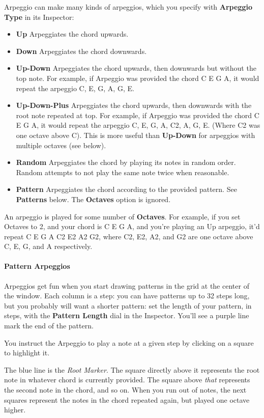 \documentclass[twoside,10pt]{article}
\begin{document}
Arpeggio can make many kinds of arpeggios, which you specify with {\bf Arpeggio Type} in its Inspector:

\begin{itemize}
\item {\bf Up} Arpeggiates the chord upwards. 
\item {\bf Down} Arpeggiates the chord downwards. 
\item {\bf Up-Down} Arpeggiates the chord upwards, then downwards but without the top note.  For example, if Arpeggio was provided the chord C E G A, it would repeat the arpeggio C, E, G, A, G, E.
\item {\bf Up-Down-Plus} Arpeggiates the chord upwards, then downwards with the root note repeated at top.  For example, if Arpeggio was provided the chord C E G A, it would repeat the arpeggio C, E, G, A, C2, A, G, E.  (Where C2 was one octave above C).  This is more useful than {\bf Up-Down} for arpeggios with multiple octaves (see below).  
\item {\bf Random} Arpeggiates the chord by playing its notes in random order.  Random attempts to not play the same note twice when reasonable. 
\item {\bf Pattern} Arpeggiates the chord according to the provided pattern.  See {\bf Patterns} below.   The {\bf Octaves} option is ignored.
\end{itemize}

An arpeggio is played for some number of {\bf Octaves}.  For example, if you set Octaves to 2, and your chord is C E G A, and you're playing an Up arpeggio, it'd repeat C E G A C2 E2 A2 G2, where C2, E2, A2, and G2 are one octave above C, E, G, and A respectively.

\paragraph{Pattern Arpeggios}

Arpeggios get fun when you start drawing patterns in the grid at the center of the window.  Each column is a step: you can have patterns up to 32 steps long, but you probably will want a shorter pattern: set the length of your pattern, in steps, with the {\bf Pattern Length} dial in the Inspector.  You'll see a purple line mark the end of the pattern.

You instruct the Arpeggio to play a note at a given step by clicking on a square to highlight it.

The blue line is the {\it Root Marker}.  The square directly above it represents the root note in whatever chord is currently provided.  The square above {\it that} represents the second note in the chord, and so on.  When you run out of notes, the next squares represent the notes in the chord repeated again, but played one octave higher.
\end{document}

